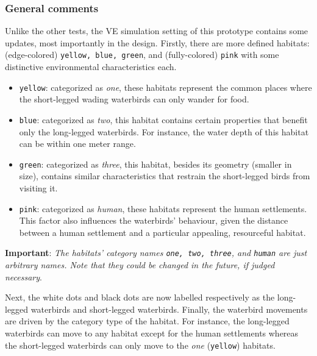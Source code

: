 \subsubsection{General comments}
Unlike the other tests, the VE simulation setting of this prototype contains some updates, most importantly in the design. Firstly, there are more defined habitats: (edge-colored) \texttt{yellow, blue, green}, and (fully-colored) \texttt{pink} with some distinctive environmental characteristics each.
\begin{itemize}
    \item \texttt{yellow}: categorized as \emph{one}, these habitats represent the common places where the short-legged wading waterbirds can only wander for food.
    \item \texttt{blue}: categorized as \emph{two}, this habitat contains certain properties that benefit only the long-legged waterbirds. For instance, the water depth of this habitat can be within one meter range.
    \item \texttt{green}: categorized as \emph{three}, this habitat, besides its geometry (smaller in size), contains similar characteristics that restrain the short-legged birds from visiting it.
    \item \texttt{pink}: categorized as \emph{human}, these habitats represent the human settlements. This factor also influences the waterbirds' behaviour, given the distance between a human settlement and a particular appealing, resourceful habitat.
\end{itemize}

\noindent
\textbf{Important}: \textit{The habitats' category names \texttt{one, two, three}, and \texttt{human} are just arbitrary names. Note that they could be changed in the future, if judged necessary}.

\noindent
Next, the white dots and black dots are now labelled respectively as the long-legged waterbirds and short-legged waterbirds. Finally, the waterbird movements are driven by the category type of the habitat. For instance, the long-legged waterbirds can move to any habitat except for the human settlements whereas the short-legged waterbirds can only move to the \emph{one} (\texttt{yellow}) habitats.

